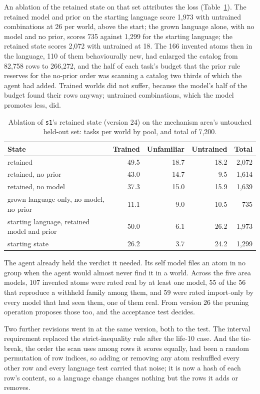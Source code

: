\documentclass[11pt]{article}
\begin{document}
An ablation of the retained state on that set attributes the loss (Table~\ref{tab:ablation}). The retained model and prior on the starting language score 1,973 with untrained combinations at 26 per world, above the start; the grown language alone, with no model and no prior, scores 735 against 1,299 for the starting language; the retained state scores 2,072 with untrained at 18. The 166 invented atoms then in the language, 110 of them behaviourally new, had enlarged the catalog from 82,758 rows to 266,272, and the half of each task's budget that the prior rule reserves for the no-prior order was scanning a catalog two thirds of which the agent had added. Trained worlds did not suffer, because the model's half of the budget found their rows anyway; untrained combinations, which the model promotes less, did.

\begin{table}[t]
\centering
\caption{Ablation of \texttt{s1}'s retained state (version 24) on the mechanism area's untouched held-out set: tasks per world by pool, and total of 7,200.}
\label{tab:ablation}
\begin{tabular}{lrrrr}
\toprule
State & Trained & Unfamiliar & Untrained & Total \\
\midrule
retained & 49.5 & 18.7 & 18.2 & 2,072 \\
retained, no prior & 43.0 & 14.7 & 9.5 & 1,614 \\
retained, no model & 37.3 & 15.0 & 15.9 & 1,639 \\
grown language only, no model, no prior & 11.1 & 9.0 & 10.5 & 735 \\
starting language, retained model and prior & 50.0 & 6.1 & 26.2 & 1,973 \\
starting state & 26.2 & 3.7 & 24.2 & 1,299 \\
\bottomrule
\end{tabular}
\end{table}

The agent already held the verdict it needed. Its self model files an atom in no group when the agent would almost never find it in a world. Across the five area models, 107 invented atoms were rated real by at least one model, 55 of the 56 that reproduce a withheld family among them, and 59 were rated import-only by every model that had seen them, one of them real. From version 26 the pruning operation proposes those too, and the acceptance test decides.

Two further revisions went in at the same version, both to the test. The interval requirement replaced the strict-inequality rule after the life-10 case. And the tie-break, the order the scan uses among rows it scores equally, had been a random permutation of row indices, so adding or removing any atom reshuffled every other row and every language test carried that noise; it is now a hash of each row's content, so a language change changes nothing but the rows it adds or removes.
\end{document}
